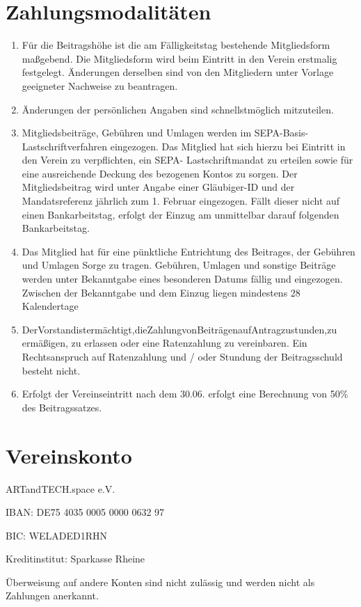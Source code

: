 \documentclass[12pt]{article}
\begin{document}
\section{Zahlungsmodalitäten}
\begin{enumerate}[label=(\arabic*)]
	\item Für die Beitragshöhe ist die am Fälligkeitstag bestehende Mitgliedsform maßgebend. Die
	      Mitgliedsform wird beim Eintritt in den Verein erstmalig festgelegt. Änderungen derselben
	      sind von den Mitgliedern unter Vorlage geeigneter Nachweise zu beantragen.
	\item Änderungen der persönlichen Angaben sind schnellstmöglich mitzuteilen.
	\item Mitgliedsbeiträge, Gebühren und Umlagen werden im SEPA-Basis-Lastschriftverfahren
	      eingezogen. Das Mitglied hat sich hierzu bei Eintritt in den Verein zu verpflichten, ein SEPA- Lastschriftmandat zu erteilen sowie für eine ausreichende Deckung des bezogenen Kontos zu sorgen.
	      Der Mitgliedsbeitrag wird unter Angabe einer Gläubiger-ID und der Mandatsreferenz jährlich zum 1. Februar eingezogen. Fällt dieser nicht auf einen Bankarbeitstag, erfolgt der Einzug am unmittelbar darauf folgenden Bankarbeitstag.
	\item Das Mitglied hat für eine pünktliche Entrichtung des Beitrages, der Gebühren und Umlagen Sorge zu tragen. Gebühren, Umlagen und sonstige Beiträge werden unter Bekanntgabe eines besonderen Datums fällig und eingezogen. Zwischen der Bekanntgabe und dem Einzug liegen mindestens 28 Kalendertage
	\item DerVorstandistermächtigt,dieZahlungvonBeiträgenaufAntragzustunden,zu ermäßigen, zu erlassen oder eine Ratenzahlung zu vereinbaren. Ein Rechtsanspruch auf Ratenzahlung und / oder Stundung der Beitragsschuld besteht nicht.
	\item Erfolgt der Vereinseintritt nach dem 30.06. erfolgt eine Berechnung von 50\% des Beitragssatzes.
\end{enumerate}

\section{Vereinskonto}

\begin{center}
	ARTandTECH.space e.V.
\end{center}
\begin{center}
	IBAN: DE75 4035 0005 0000 0632 97
\end{center}
\begin{center}
	BIC: WELADED1RHN
\end{center}
\begin{center}
	Kreditinstitut: Sparkasse Rheine
\end{center}
Überweisung auf andere Konten sind nicht zulässig und werden nicht als Zahlungen anerkannt.
\end{document}
